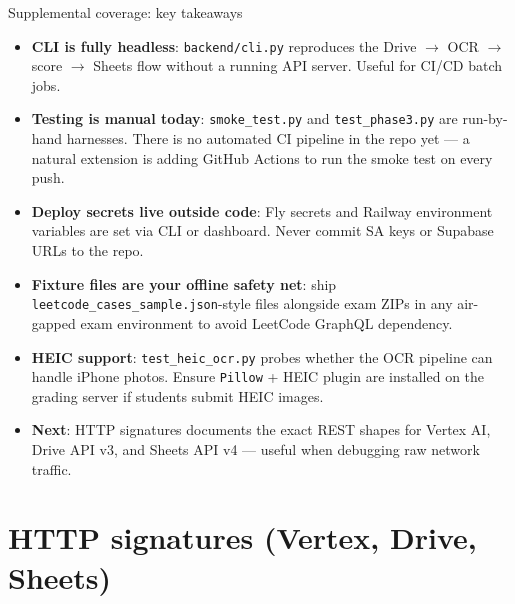 \documentclass[aspectratio=169]{beamer}
\begin{document}
\begin{frame}{Supplemental coverage: key takeaways}
  \small
  \begin{itemize}\setlength\itemsep{0.3em}
    \item \textbf{CLI is fully headless}: \texttt{backend/cli.py} reproduces the Drive $\rightarrow$ OCR $\rightarrow$ score $\rightarrow$ Sheets flow without a running API server. Useful for CI/CD batch jobs.
    \item \textbf{Testing is manual today}: \texttt{smoke\_test.py} and \texttt{test\_phase3.py} are run-by-hand harnesses. There is no automated CI pipeline in the repo yet --- a natural extension is adding GitHub Actions to run the smoke test on every push.
    \item \textbf{Deploy secrets live outside code}: Fly secrets and Railway environment variables are set via CLI or dashboard. Never commit SA keys or Supabase URLs to the repo.
    \item \textbf{Fixture files are your offline safety net}: ship \texttt{leetcode\_cases\_sample.json}-style files alongside exam ZIPs in any air-gapped exam environment to avoid LeetCode GraphQL dependency.
    \item \textbf{HEIC support}: \texttt{test\_heic\_ocr.py} probes whether the OCR pipeline can handle iPhone photos. Ensure \texttt{Pillow} + HEIC plugin are installed on the grading server if students submit HEIC images.
    \item \textbf{Next}: HTTP signatures documents the exact REST shapes for Vertex AI, Drive API v3, and Sheets API v4 --- useful when debugging raw network traffic.
  \end{itemize}
\end{frame}

\section{HTTP signatures (Vertex, Drive, Sheets)}
\end{document}
